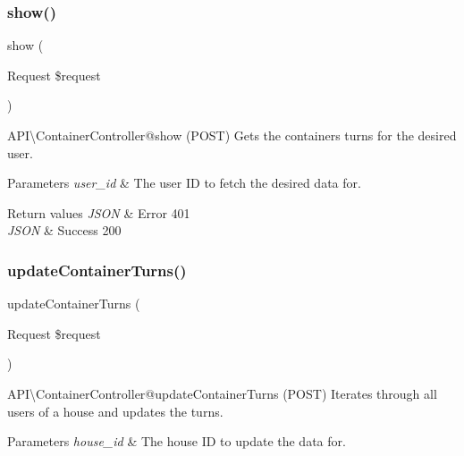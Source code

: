 \subsubsection{\texorpdfstring{show()}{show()}}
{\footnotesize\ttfamily show (\begin{DoxyParamCaption}\item[{Request}]{\$request }\end{DoxyParamCaption})}

\begin{DoxyParagraph}{A\+PI\textbackslash{}\+Container\+Controller@show (P\+O\+ST)}
Gets the containers turns for the desired user.
\end{DoxyParagraph}

\begin{DoxyParams}{Parameters}
{\em user\+\_\+id} & The user ID to fetch the desired data for.\\
\hline
\end{DoxyParams}

\begin{DoxyRetVals}{Return values}
{\em J\+S\+ON} & Error 401 \\
\hline
{\em J\+S\+ON} & Success 200 \\
\hline
\end{DoxyRetVals}
\mbox{\label{class_app_1_1_http_1_1_controllers_1_1_a_p_i_1_1_container_controller_a4e7f78121af37bfccc0b0274e280d37e}} 
\subsubsection{\texorpdfstring{updateContainerTurns()}{updateContainerTurns()}}
{\footnotesize\ttfamily update\+Container\+Turns (\begin{DoxyParamCaption}\item[{Request}]{\$request }\end{DoxyParamCaption})}

\begin{DoxyParagraph}{A\+PI\textbackslash{}\+Container\+Controller@update\+Container\+Turns (P\+O\+ST)}
Iterates through all users of a house and updates the turns.
\end{DoxyParagraph}

\begin{DoxyParams}{Parameters}
{\em house\+\_\+id} & The house ID to update the data for.\\
\hline
\end{DoxyParams}

